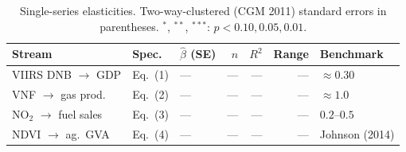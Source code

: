 \begin{table}[H]
\centering\small
\caption{Single-series elasticities. Two-way-clustered (CGM 2011) standard errors in parentheses. $^{*}$, $^{**}$, $^{***}$: $p<0.10, 0.05, 0.01$.}
\label{tab:elasticities}
\begin{tabular}{lllrrrl}
\toprule
Stream & Spec. & $\hat\beta$ (SE) & $n$ & $R^2$ & Range & Benchmark \\
\midrule
VIIRS DNB $\to$ GDP & Eq.~(1) & --- & --- & --- & --- & \citet{hsw2012} $\approx 0.30$ \\
VNF $\to$ gas prod. & Eq.~(2) & --- & --- & --- & --- & \citet{do_etal2018} $\approx 1.0$ \\
NO$_2$ $\to$ fuel sales & Eq.~(3) & --- & --- & --- & --- & \citet{bauwens2020} $0.2$--$0.5$ \\
NDVI $\to$ ag.\ GVA & Eq.~(4) & --- & --- & --- & --- & Johnson (2014) \\
\bottomrule
\end{tabular}
\end{table}